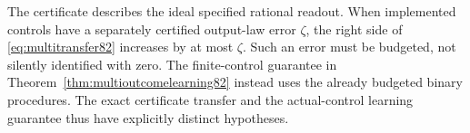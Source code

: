 The certificate describes the ideal specified rational readout.
When implemented controls have a separately certified output-law
error $\zeta$, the right side of \eqref{eq:multitransfer82} increases
by at most $\zeta$.  Such an error must be budgeted, not silently
identified with zero.  The finite-control guarantee in
Theorem~\ref{thm:multioutcomelearning82} instead uses the already
budgeted binary procedures.  The exact certificate transfer and
the actual-control learning guarantee thus have explicitly distinct
hypotheses.
